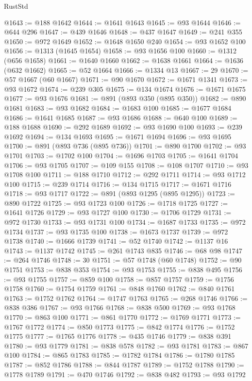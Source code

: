 \begin{lexlean}{RustStd}
\begin{coremodule}
@1643 := @188 @1642
@1644 := @1641 @1643
@1645 := @93 @1644
@1646 := @644 @296
@1647 := @439 @1646
@1648 := @437 @1647
@1649 := @241 @355
@1650 := @972 @1649
@1652 := @1648 @1650 @240
@1654 := @93 @1652 @100
@1656 := @1313 (@1645 @1654)
@1658 := @93 @1656 @100
@1660 := @1312 (@656 @1658)
@1661 := @1640 @1660
@1662 := @1638 @1661
@1664 := @1636 (@632 @1662)
@1665 := @52 @1664
@1666 := @1334 @13
@1667 := 29
@1670 := @57 @1667 (@60 @1667)
@1671 := @90 @1670
@1672 := @1671 @1341
@1673 := @93 @1672
@1674 := @239 @305
@1675 := @134 @1674
@1676 := @1671 @1675
@1677 := @93 @1676
@1681 := @891 (@893 @350 (@895 @350))
@1682 := @890 @1681
@1683 := @93 @1682
@1684 := @1683 @100
@1685 := @1677 @1684
@1686 := @1641 @1685
@1687 := @93 @1686
@1688 := @640 @100
@1689 := @188 @1688
@1690 := @292 @1689
@1692 := @93 @1690 @100
@1693 := @239 @1692
@1694 := @134 @1693
@1695 := @1671 @1694
@1696 := @93 @1695
@1700 := @891 (@893 @736 (@895 @736))
@1701 := @890 @1700
@1702 := @93 @1701
@1703 := @1702 @100
@1704 := @1696 @1703
@1705 := @1641 @1704
@1706 := @93 @1705
@1707 := @109 @155
@1708 := @108 @1707
@1710 := @93 @1708 @100
@1711 := @188 @1710
@1712 := @292 @1711
@1714 := @93 @1712 @100
@1715 := @239 @1714
@1716 := @134 @1715
@1717 := @1671 @1716
@1718 := @93 @1717
@1722 := @891 (@893 @1295 (@895 @1295))
@1723 := @890 @1722
@1725 := @93 @1723 @100
@1726 := @1718 @1725
@1727 := @1641 @1726
@1729 := @93 @1727 @100
@1730 := @1706 @1729
@1731 := @972 @1730
@1733 := @93 @1731 @100
@1734 := @1687 @1733
@1735 := @972 @1734
@1737 := @93 @1735 @100
@1738 := @1673 @1737
@1739 := @972 @1738
@1740 := @1666 @1739
@1741 := @52 @1740
@1742 := @1137 @16
@1743 := @1137 @1742
@1745 := @261 @1743 @835
@1746 := @68 @98
@1747 := @264 @1746
@1748 := 30
@1751 := @57 @1748 (@60 @1748)
@1752 := @90 @1751
@1753 := @838 @353
@1754 := @93 @1753
@1755 := @838 @495
@1756 := @93 @1755
@1757 := @859 @100
@1758 := @857 @1757
@1759 := @1756 @1758
@1760 := @1754 @1759
@1761 := @848 @1760
@1762 := @840 @1761
@1763 := @1752 @1762
@1764 := @1747 @1763
@1765 := @268 @1746
@1766 := @838 @386
@1767 := @93 @1766
@1768 := @838 @500
@1769 := @93 @1768
@1770 := @863 @100
@1771 := @861 @1770
@1772 := @1769 @1771
@1773 := @1767 @1772
@1774 := @850 @1773
@1775 := @842 @1774
@1776 := @1752 @1775
@1777 := @1765 @1776
@1778 := @435 @1746
@1779 := @838 @391
@1780 := @93 @1779
@1781 := @838 @578
@1782 := @93 @1781
@1783 := @867 @100
@1784 := @865 @1783
@1785 := @1782 @1784
@1786 := @1780 @1785
@1787 := @852 @1786
@1788 := @844 @1787
@1789 := @1752 @1788
@1790 := @1778 @1789
@1791 := @470 @1746
@1792 := @838 @482
@1793 := @93 @1792

\end{coremodule}
\end{lexlean}
